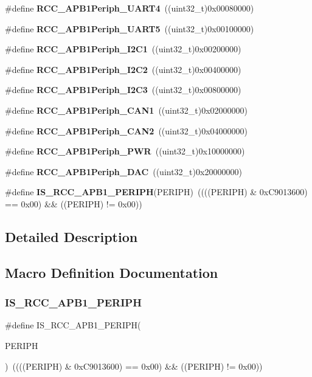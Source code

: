 \begin{DoxyCompactItemize}
\#define \textbf{ R\+C\+C\+\_\+\+A\+P\+B1\+Periph\+\_\+\+U\+A\+R\+T4}~((uint32\+\_\+t)0x00080000)
\item 
\#define \textbf{ R\+C\+C\+\_\+\+A\+P\+B1\+Periph\+\_\+\+U\+A\+R\+T5}~((uint32\+\_\+t)0x00100000)
\item 
\#define \textbf{ R\+C\+C\+\_\+\+A\+P\+B1\+Periph\+\_\+\+I2\+C1}~((uint32\+\_\+t)0x00200000)
\item 
\#define \textbf{ R\+C\+C\+\_\+\+A\+P\+B1\+Periph\+\_\+\+I2\+C2}~((uint32\+\_\+t)0x00400000)
\item 
\#define \textbf{ R\+C\+C\+\_\+\+A\+P\+B1\+Periph\+\_\+\+I2\+C3}~((uint32\+\_\+t)0x00800000)
\item 
\#define \textbf{ R\+C\+C\+\_\+\+A\+P\+B1\+Periph\+\_\+\+C\+A\+N1}~((uint32\+\_\+t)0x02000000)
\item 
\#define \textbf{ R\+C\+C\+\_\+\+A\+P\+B1\+Periph\+\_\+\+C\+A\+N2}~((uint32\+\_\+t)0x04000000)
\item 
\#define \textbf{ R\+C\+C\+\_\+\+A\+P\+B1\+Periph\+\_\+\+P\+WR}~((uint32\+\_\+t)0x10000000)
\item 
\#define \textbf{ R\+C\+C\+\_\+\+A\+P\+B1\+Periph\+\_\+\+D\+AC}~((uint32\+\_\+t)0x20000000)
\item 
\#define \textbf{ I\+S\+\_\+\+R\+C\+C\+\_\+\+A\+P\+B1\+\_\+\+P\+E\+R\+I\+PH}(P\+E\+R\+I\+PH)~((((P\+E\+R\+I\+PH) \& 0x\+C9013600) == 0x00) \&\& ((\+P\+E\+R\+I\+P\+H) != 0x00))
\end{DoxyCompactItemize}


\subsection{Detailed Description}


\subsection{Macro Definition Documentation}
\mbox{\label{group__RCC__APB1__Peripherals_gab68e85308494436c4c55a69c42a79f36}} 
\subsubsection{I\+S\+\_\+\+R\+C\+C\+\_\+\+A\+P\+B1\+\_\+\+P\+E\+R\+I\+PH}
{\footnotesize\ttfamily \#define I\+S\+\_\+\+R\+C\+C\+\_\+\+A\+P\+B1\+\_\+\+P\+E\+R\+I\+PH(\begin{DoxyParamCaption}\item[{}]{P\+E\+R\+I\+PH }\end{DoxyParamCaption})~((((P\+E\+R\+I\+PH) \& 0x\+C9013600) == 0x00) \&\& ((\+P\+E\+R\+I\+P\+H) != 0x00))}




